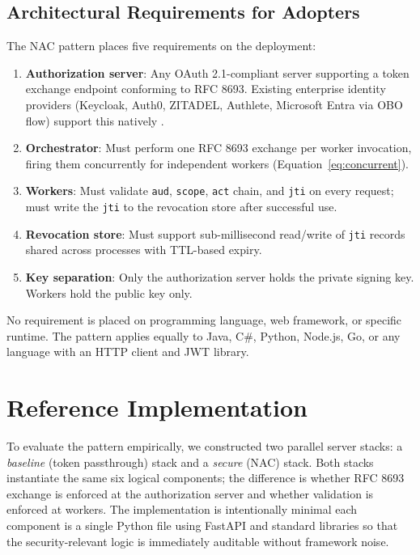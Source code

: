 \documentclass[journal]{IEEEtran}
\begin{document}
\subsection{Architectural Requirements for Adopters}

The NAC pattern places five requirements on the deployment:

\begin{enumerate}
  \item \textbf{Authorization server}: Any OAuth 2.1-compliant server supporting
        a token exchange endpoint conforming to RFC 8693. Existing enterprise
        identity providers (Keycloak, Auth0, ZITADEL, Authlete, Microsoft Entra
        via OBO flow) support this natively \cite{rfc8693_deploy}.
  \item \textbf{Orchestrator}: Must perform one RFC 8693 exchange per worker
        invocation, firing them concurrently for independent workers
        (Equation~\ref{eq:concurrent}).
  \item \textbf{Workers}: Must validate \texttt{aud}, \texttt{scope},
        \texttt{act} chain, and \texttt{jti} on every request; must write the
        \texttt{jti} to the revocation store after successful use.
  \item \textbf{Revocation store}: Must support sub-millisecond read/write of
        \texttt{jti} records shared across processes with TTL-based expiry.
  \item \textbf{Key separation}: Only the authorization server holds the private
        signing key. Workers hold the public key only.
\end{enumerate}

No requirement is placed on programming language, web framework, or specific
runtime. The pattern applies equally to Java, C\#, Python, Node.js, Go, or any
language with an HTTP client and JWT library.


\section{Reference Implementation}
\label{sec:impl}

To evaluate the pattern empirically, we constructed two parallel server stacks:
a \textit{baseline} (token passthrough) stack and a \textit{secure} (NAC) stack.
Both stacks instantiate the same six logical components; the difference is whether
RFC 8693 exchange is enforced at the authorization server and whether validation
is enforced at workers. The implementation is intentionally minimal each
component is a single Python file using FastAPI and standard libraries so that
the security-relevant logic is immediately auditable without framework noise.
\end{document}

